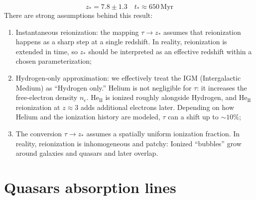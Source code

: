 \begin{equation*}
    z_{*} = 7.8 \pm 1.3 \quad t_{*} \approx 650\,\text{Myr}
\end{equation*}
There are strong assumptions behind this result:
\begin{enumerate}
    \item Instantaneous reionization: the mapping $\tau \to z_{*}$ assumes that reionization happens as a sharp step at a single redshift. In reality, reionization is extended in time, so $z_{*}$ should be interpreted as an effective redshift within a chosen parameterization;
    \item Hydrogen-only approximation: we effectively treat the IGM (Intergalactic Medium) as “Hydrogen only.” Helium is not negligible for $\tau$: it increases the free-electron density $n_{e}$. $\text{He}_{\text{II}}$ is ionized roughly alongside Hydrogen, and $\text{He}_{\text{II}}$ reionization at $z \approx 3$ adds additional electrons later. Depending on how Helium and the ionization history are modeled, $\tau$ can a shift up to $\sim 10\%$;
    \item The conversion $\tau \to z_{*}$ assumes a spatially uniform ionization fraction. In reality, reionization is inhomogeneous and patchy: Ionized “bubbles” grow around galaxies and quasars and later overlap.
\end{enumerate}

\section{Quasars absorption lines}

